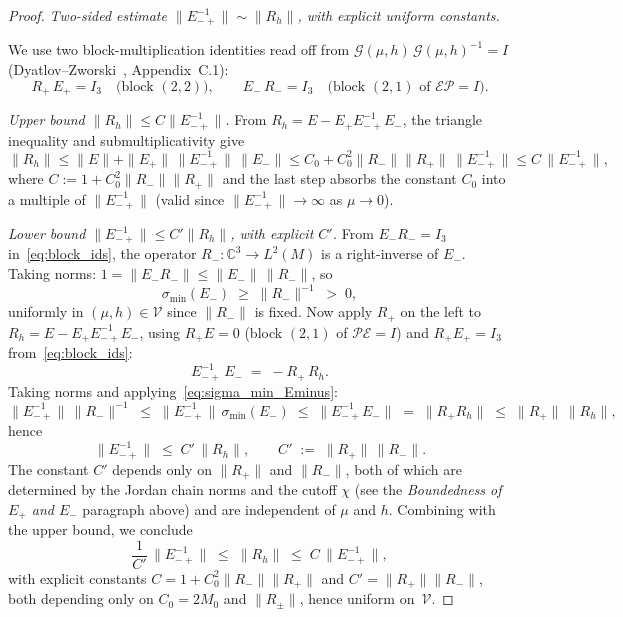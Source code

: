 \documentclass[12pt,a4paper]{amsart}
\theoremstyle{remark}
\begin{document}
\begin{proof}
\emph{Two-sided estimate $\|E_{-+}^{-1}\|\sim\|R_h\|$, with explicit uniform constants.}

We use two block-multiplication identities read off from
$\mathcal{G}(\mu,h)\,\mathcal{G}(\mu,h)^{-1} = I$
(Dyatlov--Zworski~\cite{DZ19}, Appendix~C.1):
\begin{equation}\label{eq:block_ids}
  R_+\,E_+ = I_3 \quad \text{(block $(2,2)$)},
  \qquad
  E_-\,R_- = I_3 \quad \text{(block $(2,1)$ of $\mathcal{E}\mathcal{P}=I$)}.
\end{equation}

\emph{Upper bound $\|R_h\|\leq C\|E_{-+}^{-1}\|$.}
From $R_h = E - E_+E_{-+}^{-1}E_-$, the triangle inequality and submultiplicativity give
\[
  \|R_h\| \leq \|E\| + \|E_+\|\,\|E_{-+}^{-1}\|\,\|E_-\|
  \leq C_0 + C_0^2\|R_-\|\|R_+\|\,\|E_{-+}^{-1}\|
  \leq C\,\|E_{-+}^{-1}\|,
\]
where $C := 1 + C_0^2\|R_-\|\|R_+\|$ and the last step absorbs the constant
$C_0$ into a multiple of $\|E_{-+}^{-1}\|$ (valid since
$\|E_{-+}^{-1}\|\to\infty$ as $\mu\to 0$).

\emph{Lower bound $\|E_{-+}^{-1}\|\leq C'\|R_h\|$, with explicit $C'$.}
From $E_-R_- = I_3$ in~\eqref{eq:block_ids}, the operator $R_-:\mathbb{C}^3\to L^2(M)$
is a right-inverse of $E_-$.
Taking norms: $1 = \|E_-R_-\| \leq \|E_-\|\,\|R_-\|$, so
\begin{equation}\label{eq:sigma_min_Eminus}
  \sigma_{\min}(E_-) \;\geq\; \|R_-\|^{-1} \;>\; 0,
\end{equation}
uniformly in $(\mu,h)\in\mathcal{V}$ since $\|R_-\|$ is fixed.
Now apply $R_+$ on the left to $R_h = E - E_+E_{-+}^{-1}E_-$,
using $R_+E = 0$ (block $(2,1)$ of $\mathcal{P}\mathcal{E}=I$) and
$R_+E_+ = I_3$ from~\eqref{eq:block_ids}:
\begin{equation}\label{eq:Einvplus_extract}
  E_{-+}^{-1}\,E_- \;=\; -R_+\,R_h.
\end{equation}
Taking norms and applying~\eqref{eq:sigma_min_Eminus}:
\[
  \|E_{-+}^{-1}\|\,\|R_-\|^{-1}
  \;\leq\;
  \|E_{-+}^{-1}\|\,\sigma_{\min}(E_-)
  \;\leq\;
  \|E_{-+}^{-1}E_-\|
  \;=\;
  \|R_+R_h\|
  \;\leq\;
  \|R_+\|\,\|R_h\|,
\]
hence
\begin{equation}\label{eq:lower_bound_Einvplus}
  \|E_{-+}^{-1}\| \;\leq\; C'\,\|R_h\|,
  \qquad C' \;:=\; \|R_+\|\,\|R_-\|.
\end{equation}
The constant $C'$ depends only on $\|R_+\|$ and $\|R_-\|$, both of which
are determined by the Jordan chain norms and the cutoff $\chi$
(see the \emph{Boundedness of $E_+$ and $E_-$} paragraph above)
and are independent of $\mu$ and $h$.
Combining with the upper bound, we conclude
\begin{equation}\label{eq:twosided_Rh}
  \frac{1}{C'}\,\|E_{-+}^{-1}\| \;\leq\; \|R_h\| \;\leq\; C\,\|E_{-+}^{-1}\|,
\end{equation}
with explicit constants $C = 1+C_0^2\|R_-\|\|R_+\|$ and $C' = \|R_+\|\|R_-\|$,
both depending only on $C_0 = 2M_0$ and $\|R_\pm\|$, hence uniform on~$\mathcal{V}$.


\end{proof}
\end{document}
